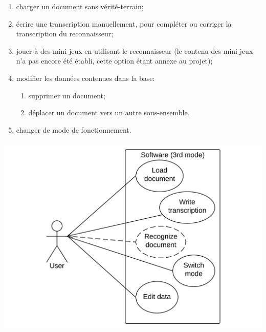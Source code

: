\begin{enumerate}
	\item charger un document sans vérité-terrain;
	\item écrire une transcription manuellement, pour compléter ou corriger la transcription du reconnaisseur;
	\item jouer à des mini-jeux en utilisant le reconnaisseur (le contenu des mini-jeux n’a pas encore été établi, cette option étant annexe au projet);
	\item modifier les données contenues dans la base:
		\begin{enumerate}
			\item supprimer un document;
			\item déplacer un document vers un autre sous-ensemble.
		\end{enumerate}
	\item changer de mode de fonctionnement.
\end{enumerate}

\paragraph{}

\begin{mdframed}[frametitle={Figure 4 : Diagramme de cas d'utilisation (mode production)}, innerbottommargin=10]
\begin{center}
\includegraphics[width=\linewidth]{Usecase_3.pdf}
\end{center}
\end{mdframed}

\paragraph{}

